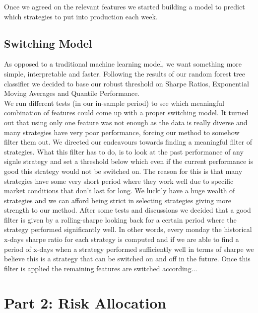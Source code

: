 \documentclass[a4paper]{article}
\begin{document}
Once we agreed on the relevant features we started building a model to predict which strategies to put into production each week.



\subsection*{Switching Model}


As opposed to a traditional machine learning model, we want something more simple, interpretable and faster. Following the results of our random forest tree classifier we decided to base our robust threshold on Sharpe Ratios, Exponential Moving Averages and Quantile Performance.\\
We run different tests (in our in-sample period) to see which meaningful combination of features could come up with a proper switching model. It turned out that using only one feature was not enough as the data is really diverse and many strategies have very poor performance, forcing our method to somehow filter them out. We directed our endeavours towards finding a meaningful filter of strategies. What this filter has to do, is to look at the past performance of any signle strategy and set a threshold below which even if the current performance is good this strategy would not be switched on. The reason for this is that many strategies have some very short period where they work well due to specific market conditions that don't last for long. We luckily have a huge wealth of strategies and we can afford being strict in selecting strategies giving more strength to our method. After some tests and discussions we decided that a good filter is given by a rolling-sharpe looking back for a certain period where the strategy performed significantly well. In other words, every monday the historical x-days sharpe ratio for each strategy is computed and if we are able to find  a period of x-days when a strategy performed sufficiently well in terms of sharpe we believe this is a strategy that can be switched on and off in the future. Once this filter is applied the remaining features are switched according...


\section*{Part 2: Risk Allocation}
\end{document}
